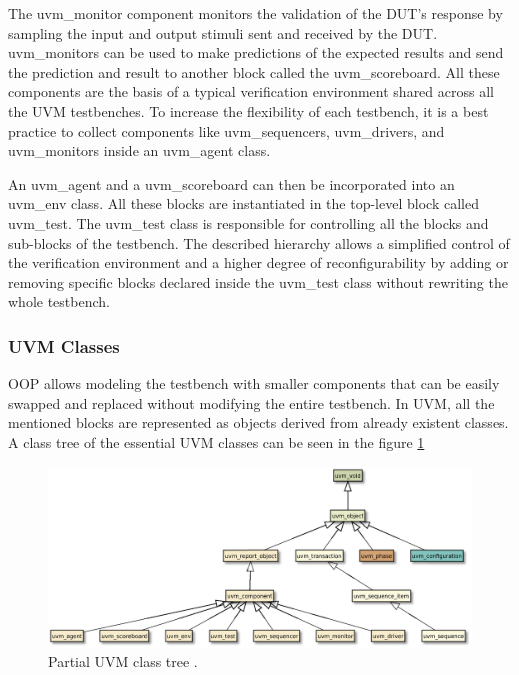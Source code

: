 The uvm\_monitor component monitors the validation of the DUT's response by
sampling the input and output stimuli sent and received by the DUT.
uvm\_monitors can be used to make predictions of the expected results and send
the prediction and result to another block called the uvm\_scoreboard. All these
components are the basis of a typical verification environment shared across all
the UVM testbenches. To increase the flexibility of each testbench, it is a best
practice to collect components like uvm\_sequencers, uvm\_drivers, and
uvm\_monitors inside an uvm\_agent class.

An uvm\_agent and a uvm\_scoreboard can then be incorporated into an uvm\_env
class. All these blocks are instantiated in the top-level block called
uvm\_test. The uvm\_test class is responsible for controlling all the blocks and
sub-blocks of the testbench. The described hierarchy allows a simplified control
of the verification environment and a higher degree of reconfigurability by
adding or removing specific blocks declared inside the uvm\_test class without
rewriting the whole testbench.


\subsubsection{UVM Classes}
OOP allows modeling the testbench with smaller components that can be easily
swapped and replaced without modifying the entire testbench. In UVM, all the
mentioned blocks are represented as objects derived from already existent
classes. A class tree of the essential UVM classes can be seen in the figure
\ref{fig:uvm:partial_tree}

\begin{figure}[htb]
\centering
\includegraphics[width=\linewidth]{pictures/UVM_class_tree.eps}
\caption{Partial UVM class tree \cite{initiative94558universal}.}
\label{fig:uvm:partial_tree}
\end{figure}

